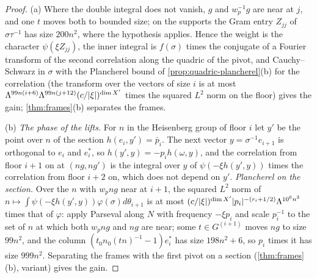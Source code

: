\begin{proof}
(a) Where the double integral does not vanish, $g$ and $w_p^{-1}g$ are near at $j$, and one $t$ moves both to bounded size; on the supports the Gram entry $Z_{jj}$ of $\sigma\tau^{-1}$ has size $200n^2$, where the hypothesis applies. Hence the weight
is the character $\psi(\xi Z_{jj})$, the inner integral is $f(\sigma)$ times the conjugate of a Fourier transform of the second correlation along the quadric of the pivot, and Cauchy--Schwarz in $\sigma$ with the Plancherel bound of
\cref{prop:quadric-plancherel}(b) for the correlation (the transform over the vectors of size $i$ is at most $\Lambda^{99n(i+6)}\Lambda^{99n(j+12)}(c/\lvert \xi\rvert)^{\dim X'}$ times the squared $L^2$ norm on the floor) gives the gain; \cref{thm:frames}(b)
separates the frames.

(b) \emph{The phase of the lifts.} For $n$ in the Heisenberg group of floor $i$ let $y'$ be the point over $n$ of the section $h(e_i,y')=\bar p_i$. The next vector $y=\sigma^{-1}e_{i+1}$ is orthogonal to $e_i$ and $e^*_i$, so
$h(y',y)=-p_ih(\omega,y)$, and the correlation from floor $i+1$ on at $(ng,ng')$ is the integral over $y$ of $\psi(-\xi h(y',y))$ times the correlation from floor $i+2$ on, which does not depend on $y'$. \emph{Plancherel on the section.} Over the $n$
with $w_png$ near at $i+1$, the squared $L^2$ norm of $n\mapsto\int\psi(-\xi h(y',y))\varphi(\sigma)d\theta_{i+1}$ is at most $(c/\lvert \xi\rvert)^{\dim X'}\lvert p_i\rvert^{-(r_i+1/2)}\Lambda^{10^6n^3}$ times that of $\varphi$: apply Parseval along $N$ with frequency
$-\xi p_i$ and scale $p_i^{-1}$ to the set of $n$ at which both $w_png$ and $ng$ are near; some $t\in G^{(i+1)}$ moves $ng$ to size $99n^2$, and the column $(t_0n_0(tn)^{-1}-1)e^*_i$ has size $198n^2+6$, so $p_i$ times it has size $999n^2$.
Separating the frames with the first pivot on a section (\cref{thm:frames}(b), variant) gives the gain.


\end{proof}
